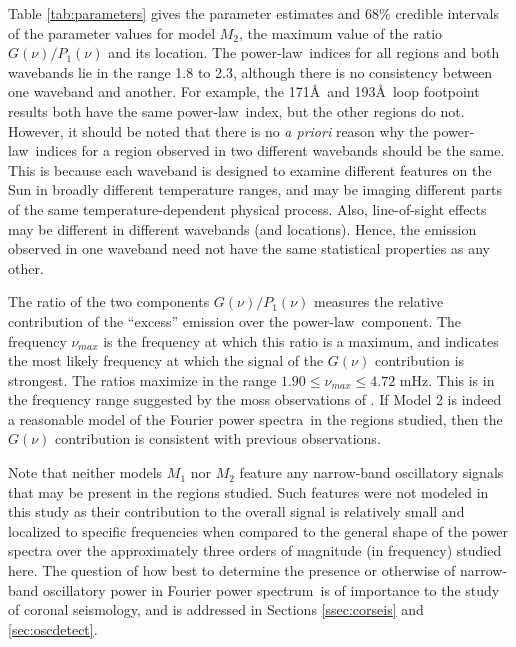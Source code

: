 \documentclass[onecolumn]{emulateapj}
\newcommand{\PS}{power spectrum}
\newcommand{\PA}{power spectra}
\newcommand{\PL}{power-law}
\newcommand{\Fps}{Fourier \PS}
\newcommand{\Fpa}{Fourier \PA}
\newcommand{\BF}{ }
\begin{document}
Table \ref{tab:parameters} gives the parameter estimates and 68\%
credible intervals of the parameter values for model $M_{2}$, {\BF the
  maximum value of the ratio $G(\nu)/P_{1}(\nu)$ and its location}.
The \PL\ indices for all regions and both wavebands lie in the
range 1.8 to 2.3, although there is no consistency between one
waveband and another.  For example, the 171\AA\ and 193\AA\ loop
footpoint results both have the same \PL\ index, but the other
regions do not.  However, it should be noted that there is no {\it a
  priori} reason why the \PL\ indices for a region observed in two
different wavebands should be the same.  This is because each waveband
is designed to examine different features on the Sun in broadly
different temperature ranges, and may be imaging {\BF different parts
  of the same temperature-dependent physical process.  Also,
  line-of-sight effects may be different in different wavebands (and
  locations).}  Hence, the emission observed in one waveband need not have
the same statistical properties as any other.

The ratio of the two components $G(\nu)/P_{1}(\nu)$ measures the
relative contribution of the ``excess'' emission over the
\PL\ component.  The frequency $\nu_{max}$ is the frequency at which
this ratio is a maximum, and indicates the most likely frequency at
which the signal of the $G(\nu)$ contribution is strongest.  The
ratios maximize in the range $1.90 \le \nu_{max} \le 4.72$ mHz.  This
is in the frequency range suggested by the moss observations of
\cite{2003ApJ...595L..63D}.  If Model 2 is indeed a reasonable model
of the \Fpa\ in the regions studied, then the $G(\nu)$ contribution is
consistent with previous observations.

Note that neither models $M_{1}$ nor $M_{2}$ feature any narrow-band
oscillatory signals that may be present in the regions studied.  Such
features were not modeled in this study as their contribution to the
overall signal is relatively small and localized to specific
frequencies when compared to the general shape of the power spectra
over the approximately three orders of magnitude (in frequency)
studied here.  The question of how best to determine the presence or
otherwise of narrow-band oscillatory power in \Fps\ is of importance
to the study of coronal seismology, and is addressed in Sections
\ref{ssec:corseis} and \ref{sec:oscdetect}.
\end{document}
